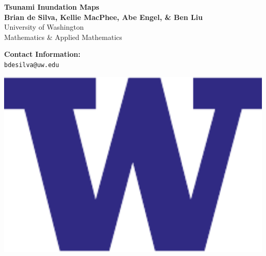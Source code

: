 \documentclass[a0,landscape]{a0poster}
\begin{document}


\begin{minipage}[b]{0.63\linewidth}
\raggedright
\veryHuge \color{MidnightBlue} \textbf{Tsunami Inundation Maps} \color{Black}\\ %
\huge \textbf{Brian de Silva, Kellie MacPhee, Abe Engel, \& Ben Liu}\\ %
\huge University of Washington\\ Mathematics \& Applied Mathematics\\ %
\end{minipage}
%
\begin{minipage}[b]{0.20\linewidth}
\color{DarkRed}\Large \textbf{Contact Information:}\\
\texttt{bdesilva@uw.edu}\\ %
\end{minipage}
%
\begin{minipage}[b]{0.15\linewidth}
\includegraphics[width=15cm]{figures/UW_logo.pdf} %
\end{minipage}
\vspace{1cm} %
\end{document}
